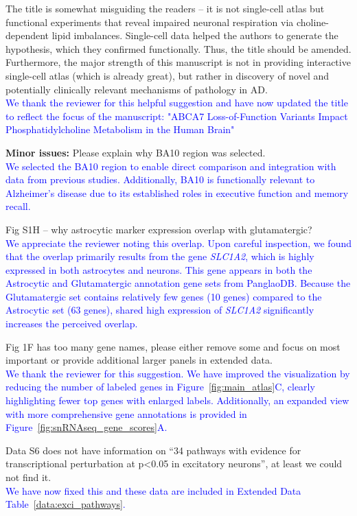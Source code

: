 The title is somewhat misguiding the readers – it is not single-cell atlas but functional experiments that reveal impaired neuronal respiration via choline-dependent lipid imbalances. Single-cell data helped the authors to generate the hypothesis, which they confirmed functionally. Thus, the title should be amended. Furthermore, the major strength of this manuscript is not in providing interactive single-cell atlas (which is already great), but rather in discovery of novel and potentially clinically relevant mechanisms of pathology in AD.\\
\textcolor{blue}{We thank the reviewer for this helpful suggestion and have now updated the title to reflect the focus of the manuscript: "ABCA7 Loss-of-Function Variants Impact Phosphatidylcholine Metabolism in the Human Brain"}

\textbf{Minor issues:}
Please explain why BA10 region was selected.\\
\textcolor{blue}{We selected the BA10 region to enable direct comparison and integration with data from previous studies. Additionally, BA10 is functionally relevant to Alzheimer's disease due to its established roles in executive function and memory recall.}

Fig S1H – why astrocytic marker expression overlap with glutamatergic?\\	
\textcolor{blue}{We appreciate the reviewer noting this overlap. Upon careful inspection, we found that the overlap primarily results from the gene \textit{SLC1A2}, which is highly expressed in both astrocytes and neurons. This gene appears in both the Astrocytic and Glutamatergic annotation gene sets from PanglaoDB. Because the Glutamatergic set contains relatively few genes (10 genes) compared to the Astrocytic set (63 genes), shared high expression of \textit{SLC1A2} significantly increases the perceived overlap.}

Fig 1F has too many gene names, please either remove some and focus on most important or provide additional larger panels in extended data.\\
\textcolor{blue}{We thank the reviewer for this suggestion. We have improved the visualization by reducing the number of labeled genes in Figure~\ref{fig:main_atlas}C, clearly highlighting fewer top genes with enlarged labels. Additionally, an expanded view with more comprehensive gene annotations is provided in Figure~\ref{fig:snRNAseq_gene_scores}A.}

Data S6 does not have information on “34 pathways with evidence for transcriptional perturbation at p<0.05 in excitatory neurons”, at least we could not find it.\\
\textcolor{blue}{We have now fixed this and these data are included in Extended Data Table~\ref{data:exci_pathways}.}

